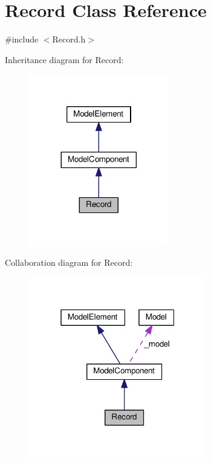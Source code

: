 \hypertarget{class_record}{}\section{Record Class Reference}
\label{class_record}


{\ttfamily \#include $<$Record.\+h$>$}



Inheritance diagram for Record\+:\nopagebreak
\begin{figure}[H]
\begin{center}
\leavevmode
\includegraphics[width=173pt]{class_record__inherit__graph}
\end{center}
\end{figure}


Collaboration diagram for Record\+:\nopagebreak
\begin{figure}[H]
\begin{center}
\leavevmode
\includegraphics[width=220pt]{class_record__coll__graph}
\end{center}
\end{figure}

